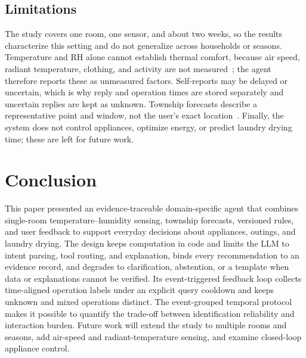 \documentclass[conference]{IEEEtran}
\newcommand{\todo}[1]{\textcolor{red}{#1}}
\begin{document}
\subsection{Limitations}
The study covers one room, one sensor, and about two weeks, so the results characterize this setting and do not generalize across households or seasons. Temperature and RH alone cannot establish thermal comfort, because air speed, radiant temperature, clothing, and activity are not measured~\cite{ashrae55}; the agent therefore reports these as unmeasured factors. Self-reports may be delayed or uncertain, which is why reply and operation times are stored separately and uncertain replies are kept as unknown. Township forecasts describe a representative point and window, not the user's exact location~\cite{cwa_township}. Finally, the system does not control appliances, optimize energy, or predict laundry drying time; these are left for future work.

\section{Conclusion}
This paper presented an evidence-traceable domain-specific agent that combines single-room temperature--humidity sensing, township forecasts, versioned rules, and user feedback to support everyday decisions about appliances, outings, and laundry drying. The design keeps computation in code and limits the LLM to intent parsing, tool routing, and explanation, binds every recommendation to an evidence record, and degrades to clarification, abstention, or a template when data or explanations cannot be verified. Its event-triggered feedback loop collects time-aligned operation labels under an explicit query cooldown and keeps unknown and mixed operations distinct. The event-grouped temporal protocol makes it possible to quantify the trade-off between identification reliability and interaction burden. Future work will extend the study to multiple rooms and seasons, add air-speed and radiant-temperature sensing, and examine closed-loop appliance control.




\end{document}
